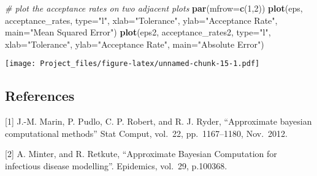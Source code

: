 \documentclass[
]{article}
\newenvironment{Shaded}{\begin{snugshade}}{\end{snugshade}}
\newcommand{\AttributeTok}[1]{\textcolor[rgb]{0.13,0.29,0.53}{#1}}
\newcommand{\CommentTok}[1]{\textcolor[rgb]{0.56,0.35,0.01}{\textit{#1}}}
\newcommand{\DecValTok}[1]{\textcolor[rgb]{0.00,0.00,0.81}{#1}}
\newcommand{\FunctionTok}[1]{\textcolor[rgb]{0.13,0.29,0.53}{\textbf{#1}}}
\newcommand{\NormalTok}[1]{#1}
\newcommand{\StringTok}[1]{\textcolor[rgb]{0.31,0.60,0.02}{#1}}
\begin{document}
\begin{Shaded}
\begin{Highlighting}[]
\CommentTok{\# plot the acceptance rates on two adjacent plots}
\FunctionTok{par}\NormalTok{(}\AttributeTok{mfrow=}\FunctionTok{c}\NormalTok{(}\DecValTok{1}\NormalTok{,}\DecValTok{2}\NormalTok{))}
\FunctionTok{plot}\NormalTok{(eps, acceptance\_rates, }\AttributeTok{type=}\StringTok{"l"}\NormalTok{, }\AttributeTok{xlab=}\StringTok{"Tolerance"}\NormalTok{, }\AttributeTok{ylab=}\StringTok{"Acceptance Rate"}\NormalTok{, }\AttributeTok{main=}\StringTok{"Mean Squared Error"}\NormalTok{)}
\FunctionTok{plot}\NormalTok{(eps2, acceptance\_rates2, }\AttributeTok{type=}\StringTok{"l"}\NormalTok{, }\AttributeTok{xlab=}\StringTok{"Tolerance"}\NormalTok{, }\AttributeTok{ylab=}\StringTok{"Acceptance Rate"}\NormalTok{, }\AttributeTok{main=}\StringTok{"Absolute Error"}\NormalTok{)}
\end{Highlighting}
\end{Shaded}

\texttt{[image: Project\_files/figure-latex/unnamed-chunk-15-1.pdf]}

\subsection{References}\label{references}

{[}1{]} J.-M. Marin, P. Pudlo, C. P. Robert, and R. J. Ryder,
``Approximate bayesian computational methods'' Stat Comput, vol.~22,
pp.~1167--1180, Nov.~2012.

{[}2{]} A. Minter, and R. Retkute, ``Approximate Bayesian Computation
for infectious disease modelling''. Epidemics, vol.~29, p.100368.
\end{document}
